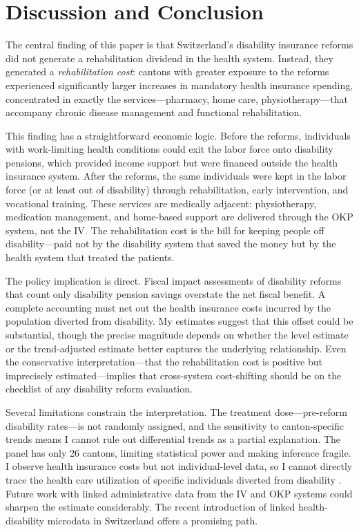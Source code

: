 \documentclass[12pt]{article}
\begin{document}
\section{Discussion and Conclusion}

The central finding of this paper is that Switzerland's disability insurance reforms did not generate a rehabilitation dividend in the health system. Instead, they generated a \emph{rehabilitation cost}: cantons with greater exposure to the reforms experienced significantly larger increases in mandatory health insurance spending, concentrated in exactly the services---pharmacy, home care, physiotherapy---that accompany chronic disease management and functional rehabilitation.

This finding has a straightforward economic logic. Before the reforms, individuals with work-limiting health conditions could exit the labor force onto disability pensions, which provided income support but were financed outside the health insurance system. After the reforms, the same individuals were kept in the labor force (or at least out of disability) through rehabilitation, early intervention, and vocational training. These services are medically adjacent: physiotherapy, medication management, and home-based support are delivered through the OKP system, not the IV. The rehabilitation cost is the bill for keeping people off disability---paid not by the disability system that saved the money but by the health system that treated the patients.

The policy implication is direct. Fiscal impact assessments of disability reforms that count only disability pension savings overstate the net fiscal benefit. A complete accounting must net out the health insurance costs incurred by the population diverted from disability. My estimates suggest that this offset could be substantial, though the precise magnitude depends on whether the level estimate or the trend-adjusted estimate better captures the underlying relationship. Even the conservative interpretation---that the rehabilitation cost is positive but imprecisely estimated---implies that cross-system cost-shifting should be on the checklist of any disability reform evaluation.

Several limitations constrain the interpretation. The treatment dose---pre-reform disability rates---is not randomly assigned, and the sensitivity to canton-specific trends means I cannot rule out differential trends as a partial explanation. The panel has only 26 cantons, limiting statistical power and making inference fragile. I observe health insurance costs but not individual-level data, so I cannot directly trace the health care utilization of specific individuals diverted from disability \citep[cf.][who study individual health trajectories around labor force exits]{chen2015health, jeon2017effect}. Future work with linked administrative data from the IV and OKP systems could sharpen the estimate considerably. The recent introduction of linked health-disability microdata in Switzerland \citep{bfs2020linked} offers a promising path.
\end{document}
